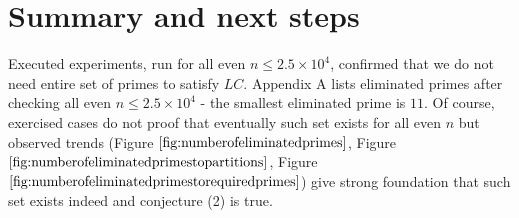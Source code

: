 \documentclass[10pt,twocolumn]{article}
\begin{document}
\section{Summary and next steps}

Executed experiments, run for all even $n \leq 2.5 \times 10^4$, confirmed that we do not need entire set of primes to satisfy $LC$. Appendix A lists eliminated primes after checking all even $n \leq 2.5 \times 10^4$ - the smallest eliminated prime is $11$. Of course, exercised cases do not proof that eventually such set exists for all even $n$ but observed trends (Figure $\ref{fig:numberofeliminatedprimes}$, Figure $\ref{fig:numberofeliminatedprimestopartitions}$,  Figure $\ref{fig:numberofeliminatedprimestorequiredprimes}$) give strong foundation that such set exists indeed and conjecture (2) is true. \par
\end{document}
